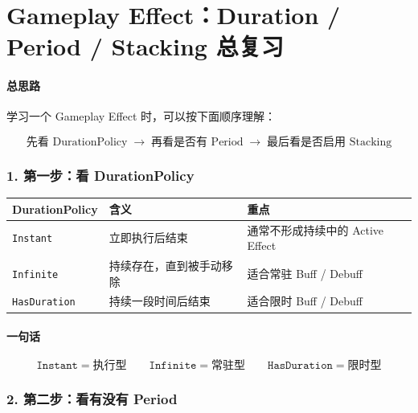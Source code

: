 \documentclass[CJKmath=true,10pt]{MyBook}
\begin{document}

\section{Gameplay Effect：Duration / Period / Stacking 总复习}

\paragraph{总思路}
学习一个 Gameplay Effect 时，可以按下面顺序理解：

\[
\boxed{
	\text{先看 DurationPolicy}
	\;\rightarrow\;
	\text{再看是否有 Period}
	\;\rightarrow\;
	\text{最后看是否启用 Stacking}
}
\]

\subsubsection{1. 第一步：看 DurationPolicy}

\begin{longtable}{@{}p{}p{}p{}@{}}
	\toprule
	\textbf{DurationPolicy} & \textbf{含义} & \textbf{重点} \\
	\midrule
	\endhead
	
	\texttt{Instant}
	&
	立即执行后结束
	&
	通常不形成持续中的 Active Effect
	\\
	
	\texttt{Infinite}
	&
	持续存在，直到被手动移除
	&
	适合常驻 Buff / Debuff
	\\
	
	\texttt{HasDuration}
	&
	持续一段时间后结束
	&
	适合限时 Buff / Debuff
	\\
	
	\bottomrule
\end{longtable}

\paragraph{一句话}
\[
\texttt{Instant} = 执行型
\qquad
\texttt{Infinite} = 常驻型
\qquad
\texttt{HasDuration} = 限时型
\]

\subsubsection{2. 第二步：看有没有 Period}
\end{document}
